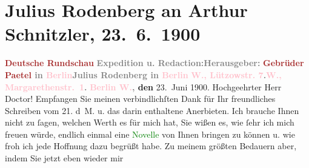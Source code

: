 

               \section[Julius Rodenberg an Arthur Schnitzler, 23. 6. 1900]{ Julius Rodenberg an Arthur Schnitzler, 23. 6. 1900}\nopagebreak{}\rehead{ }\normalsize\beginnumbering{} \toendnotes[C]{\smallbreak\pagebreak[2]} 
\toendnotes[C]{\smallbreak}\pstart
           \noindent{}\centering{}{\pb}\textcolor{gray}{\textbf{\textcolor{brown}{Deutsche Rundschau}{}\ledrightnote{\textcolor{brown}{Deutsche Rundschau}}}}\pend
           \pstart
           \noindent{}\textcolor{gray}{\textbf{Expedition u. Redaction:}}\hfill \textcolor{gray}{\textbf{Herausgeber:}}\pend
           \pstart
           \textcolor{gray}{\textbf{\textcolor{brown}{Gebrüder Paetel}{}\ledrightnote{\textcolor{brown}{Gebrüder Paetel Verlag}} in \textcolor{pink}{Berlin}{}\ledrightnote{\textcolor{pink}{Berlin}}}}\hfill \textcolor{gray}{\textbf{Julius Rodenberg in \textcolor{pink}{Berlin}{}\ledrightnote{\textcolor{pink}{Berlin}}}}\pend
           \pstart
           \textcolor{gray}{\textbf{\textcolor{pink}{W., Lützowstr. 7}{}\ledrightnote{\textcolor{pink}{Lützowstraße}}.}}\hfill \textcolor{gray}{\textbf{\textcolor{pink}{W., Margarethenstr. 1}{}\ledrightnote{\textcolor{pink}{Margaretenstraße}}.}}\pend
           \pstart
           \raggedleft{}\textbf{\textcolor{gray}{\textbf{\textcolor{pink}{Berlin W.}{}\ledrightnote{\textcolor{pink}{Berlin}},}} den}{ }23. Juni 1900.\pend
           \pstart{}Hochgeehrter Herr Doctor!\pend\pstart
           Empfangen Sie meinen verbindlichſten Dank für Ihr freundliches Schreiben vom
                        21. d M. u. das darin enthaltene Anerbieten. Ich brauche Ihnen
                    nicht zu ſagen, welchen Werth es für mich hat, Sie wißen es, wie ſehr ich mich
                    freuen würde, endlich einmal eine \textcolor{green}{Novelle}{} von Ihnen bringen zu können u. wie froh ich jede Hoffnung dazu
                    begrüßt habe. Zu meinem größten Bedauern aber, indem Sie jetzt eben wieder mir
